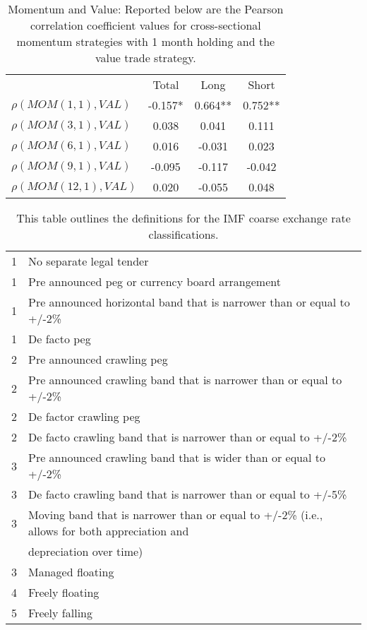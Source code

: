 \documentclass{article}
\begin{document}
\begin{table}[htbp]
  \centering
    \caption{Momentum and Value: Reported below are the Pearson correlation coefficient values for cross-sectional momentum strategies with 1 month holding and the value trade strategy.}
    \begin{tabular}{lccc}
    \toprule
    \multicolumn{1}{r}{} & Total & Long  & Short \\
    $\rho(MOM(1,1),VAL)$ & -0.157* & 0.664** & 0.752** \\
    $\rho(MOM(3,1),VAL)$ & 0.038 & 0.041 & 0.111 \\
    $\rho(MOM(6,1),VAL)$ & 0.016 & -0.031 & 0.023 \\
    $\rho(MOM(9,1),VAL)$ & -0.095 & -0.117 & -0.042 \\
    $\rho(MOM(12,1),VAL)$ & 0.020 & -0.055 & 0.048 \\
    \bottomrule
    \end{tabular}%
  \label{tab:addlabel}%
\end{table}%

\begin{table}[htbp]
  \centering
  \caption{This table outlines the definitions for the IMF coarse exchange rate classifications.}
    \begin{tabular}{cp{20.335em}}
    \toprule
    1     & No separate legal tender \\
    1     & Pre announced peg or currency board arrangement \\
    1     & Pre announced horizontal band that is narrower than or equal to +/-2\% \\
    1     & De facto peg \\
    2     & Pre announced crawling peg \\
    2     & Pre announced crawling band that is narrower than or equal to +/-2\% \\
    2     & De factor crawling peg \\
    2     & De facto crawling band that is narrower than or equal to +/-2\% \\
    3     & Pre announced crawling band that is wider than or equal to +/-2\% \\
    3     & De facto crawling band that is narrower than or equal to +/-5\% \\
    3     & Moving band that is narrower than or equal to +/-2\% (i.e., allows for both appreciation and  \\
          & depreciation over time) \\
    3     & Managed floating \\
    4     & Freely floating \\
    5     & Freely falling \\
    \bottomrule
    \end{tabular}%
  \label{IMFC}%
\end{table}%
\end{document}
